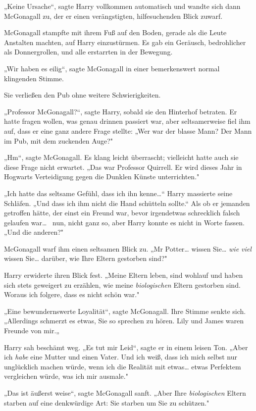 {„Keine Ursache“, sagte Harry vollkommen automatisch und wandte sich dann McGonagall zu, der er einen verängstigten, hilfesuchenden Blick zuwarf.

McGonagall stampfte mit ihrem Fuß auf den Boden, gerade als die Leute Anstalten machten, auf Harry einzustürmen. Es gab ein Geräusch, bedrohlicher als Donnergrollen, und alle erstarrten in der Bewegung.

„Wir haben es eilig“, sagte McGonagall in einer bemerkenswert normal klingenden Stimme.

Sie verließen den Pub ohne weitere Schwierigkeiten.

„Professor McGonagall?“, sagte Harry, sobald sie den Hinterhof betraten. Er hatte fragen wollen, was genau drinnen passiert war, aber seltsamerweise fiel ihm auf, dass er eine ganz andere Frage stellte: „Wer war der blasse Mann? Der Mann im Pub, mit dem zuckenden Auge?"

„Hm“, sagte McGonagall. Es klang leicht überrascht; vielleicht hatte auch sie diese Frage nicht erwartet. „Das war Professor Quirrell. Er wird dieses Jahr in Hogwarts Verteidigung gegen die Dunklen Künste unterrichten."

„Ich hatte das seltsame Gefühl, dass ich ihn kenne…“ Harry massierte seine Schläfen. „Und dass ich ihm nicht die Hand schütteln sollte.“ Als ob er jemanden getroffen hätte, der einst ein Freund war, bevor irgendetwas schrecklich falsch gelaufen war… ~nun, nicht ganz so, aber Harry konnte es nicht in Worte fassen. „Und die anderen?"

McGonagall warf ihm einen seltsamen Blick zu. „Mr Potter… wissen Sie… \emph{wie viel} wissen Sie… darüber, wie Ihre Eltern gestorben sind?"

Harry erwiderte ihren Blick fest. „Meine Eltern leben, sind wohlauf und haben sich stets geweigert zu erzählen, wie meine \emph{biologischen} Eltern gestorben sind. Woraus ich folgere, dass es nicht schön war."

„Eine bewundernswerte Loyalität“, sagte McGonagall. Ihre Stimme senkte sich. „Allerdings schmerzt es etwas, Sie so sprechen zu hören. Lily und James waren Freunde von mir.„

Harry sah beschämt weg. „Es tut mir Leid“, sagte er in einem leisen Ton. „Aber ich \emph{habe} eine Mutter und einen Vater. Und ich weiß, dass ich mich selbst nur unglücklich machen würde, wenn ich die Realität mit etwas… etwas Perfektem vergleichen würde, was ich mir ausmale."

„Das ist äußerst weise“, sagte McGonagall sanft. „Aber Ihre \emph{biologischen} Eltern starben auf eine denkwürdige Art: Sie starben um Sie zu schützen."

}
